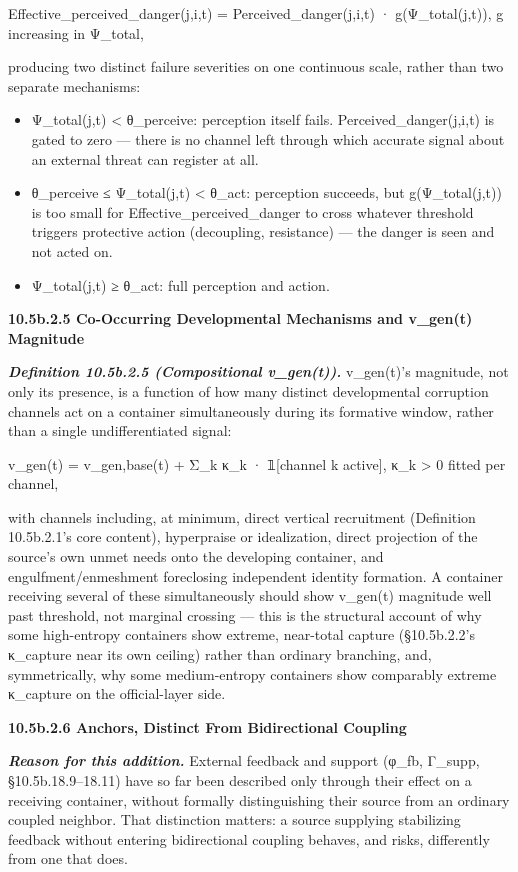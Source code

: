 \documentclass[
]{article}
\begin{document}
Effective\_perceived\_danger(j,i,t) = Perceived\_danger(j,i,t) ·
g(Ψ\_total(j,t)), g increasing in Ψ\_total,

producing two distinct failure severities on one continuous scale,
rather than two separate mechanisms:

\begin{itemize}
\item
  Ψ\_total(j,t) \textless{} θ\_perceive: perception itself fails.
  Perceived\_danger(j,i,t) is gated to zero --- there is no channel left
  through which accurate signal about an external threat can register at
  all.
\item
  θ\_perceive ≤ Ψ\_total(j,t) \textless{} θ\_act: perception succeeds,
  but g(Ψ\_total(j,t)) is too small for Effective\_perceived\_danger to
  cross whatever threshold triggers protective action (decoupling,
  resistance) --- the danger is seen and not acted on.
\item
  Ψ\_total(j,t) ≥ θ\_act: full perception and action.
\end{itemize}

\textbf{10.5b.2.5 Co-Occurring Developmental Mechanisms and v\_gen(t)
Magnitude}

\emph{\textbf{Definition 10.5b.2.5 (Compositional v\_gen(t)).}}
v\_gen(t)'s magnitude, not only its presence, is a function of how many
distinct developmental corruption channels act on a container
simultaneously during its formative window, rather than a single
undifferentiated signal:

v\_gen(t) = v\_gen,base(t) + Σ\_k κ\_k · 𝟙{[}channel k active{]}, κ\_k
\textgreater{} 0 fitted per channel,

with channels including, at minimum, direct vertical recruitment
(Definition 10.5b.2.1's core content), hyperpraise or idealization,
direct projection of the source's own unmet needs onto the developing
container, and engulfment/enmeshment foreclosing independent identity
formation. A container receiving several of these simultaneously should
show v\_gen(t) magnitude well past threshold, not marginal crossing ---
this is the structural account of why some high-entropy containers show
extreme, near-total capture (§10.5b.2.2's κ\_capture near its own
ceiling) rather than ordinary branching, and, symmetrically, why some
medium-entropy containers show comparably extreme κ\_capture on the
official-layer side.

\textbf{10.5b.2.6 Anchors, Distinct From Bidirectional Coupling}

\emph{\textbf{Reason for this addition.}} External feedback and support
(φ\_fb, Γ\_supp, §10.5b.18.9--18.11) have so far been described only
through their effect on a receiving container, without formally
distinguishing their source from an ordinary coupled neighbor. That
distinction matters: a source supplying stabilizing feedback without
entering bidirectional coupling behaves, and risks, differently from one
that does.
\end{document}
